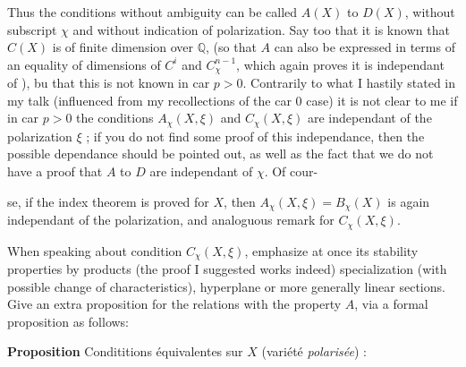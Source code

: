 \documentclass[11pt,a4paper]{article}
\begin{document}
Thus the  conditions without ambiguity can be called $A(X)$
to $D(X)$, without  subscript $\chi$ and without indication of
polarization.
Say too that it is known that $C(X)$ is of finite dimension over $\mathbb{Q}$,
(so that $A$ can also be expressed in terms of an equality of dimensions of
$C^{i}$ and $C^{n-1}_{\chi}$, which again proves it is independant of ), bu that
this is not known in car $p > 0$. Contrarily to what I hastily stated in my talk
(influenced from my recollections of the car $0$ case) it is not clear to me if
in car $p > 0$ the conditions \struck{\ill{}} $A_{\chi}(X, \xi)$ and
$C_{\chi}(X, \xi)$ are independant of the polarization $\xi$ ; if you do not
find some proof of this independance, then the possible dependance should be
pointed out, as well as the fact that  we do not have a proof
that $A$ to $D$ are independant of $\chi$. Of cour-


se, if the index theorem is proved for $X$, then $A_{\chi}(X, \xi) =
B_{\chi}(X)$ is again independant of the polarization, and analoguous remark for
$C_{\chi}(X, \xi)$.

When speaking about condition $C_{\chi}(X, \xi)$, emphasize at once its
stability properties by products (the proof I suggested works indeed)
specialization (with possible change of characteristics), hyperplane or more
generally linear sections. Give an extra proposition for the relations with the
property $A$, via a formal proposition as follows:

\textbf{Proposition} Condititions équivalentes sur $X$ (variété
\emph{polarisée}) :
\end{document}
